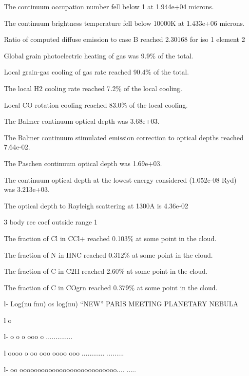 {   The continuum occupation number fell below 1 at 1.944e+04 microns.

   The continuum brightness temperature fell below 10000K at 1.433e+06
microns.

   Ratio of computed diffuse emission to case B reached 2.30168 for iso
1 element 2

   Global grain photoelectric heating of gas was  9.9\% of the total.

   Local grain-gas cooling of gas rate reached  90.4\% of the total.

   The local H2 cooling rate reached 7.2\% of the local cooling.

   Local CO rotation cooling reached 83.0\% of the local cooling.

   The Balmer continuum optical depth was  3.68e+03.

   The Balmer continuum stimulated emission correction to optical depths
reached  7.64e-02.

   The Paschen continuum optical depth was 1.69e+03.

   The continuum optical depth at the lowest energy considered (1.052e-08
Ryd) was  3.213e+03.

   The optical depth to Rayleigh scattering at 1300A is 4.36e-02

   3 body rec coef outside range 1

   The fraction of Cl in CCl+   reached 0.103\% at some point in the cloud.

   The fraction of N  in HNC    reached 0.312\% at some point in the cloud.

   The fraction of C  in C2H    reached 2.60\% at some point in the cloud.

   The fraction of C  in COgrn  reached 0.379\% at some point in the cloud.

 
    l-                      Log(nu fnu) os log(nu) ``NEW'' PARIS MEETING
PLANETARY NEBULA                                      

     l    o                                                            

     l-         o         o      o ooo   o                     ..............

     l           oooo  o     oo  ooo oooo  ooo     ............        
.........                                         

     l-   oo        ooooooooooooooooooooooooooo....                    
.....                                     

}
